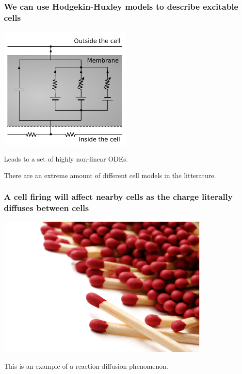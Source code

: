 \documentclass[norsk, 12pt]{beamer}
\begin{document}
\begin{frame}[fragile]
\frametitle{We can use Hodgekin-Huxley models to describe excitable cells}

\begin{center}
	\includegraphics[width=0.5\textwidth]{HH2}
\end{center}

Leads to a set of highly non-linear ODEs.

There are an extreme amount of different cell models in the litterature.
\end{frame}


\begin{frame}[fragile]
\frametitle{A cell firing will affect nearby cells as the charge literally diffuses between cells}
\begin{center}
	\includegraphics[width=0.8\textwidth]{matches}
\end{center}
This is an example of a reaction-diffusion phenomenon.
\end{frame}
\end{document}
